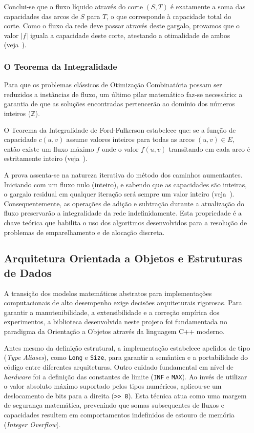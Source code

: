 \documentclass[12pt,a4paper]{article}
\begin{document}
Conclui-se que o fluxo líquido através do corte $(S, T)$ é exatamente a soma das capacidades das arcos de $S$ para $T$, o que corresponde à capacidade total do corte. Como o fluxo da rede deve passar através deste gargalo, provamos que o valor $|f|$ iguala a capacidade deste corte, atestando a otimalidade de ambos (veja~\cite{ford1956maximal}).

\subsubsection{O Teorema da Integralidade}

Para que os problemas clássicos de Otimização Combinatória possam ser reduzidos a instâncias de fluxo, um último pilar matemático faz-se necessário: a garantia de que as soluções encontradas pertencerão ao domínio dos números inteiros ($\mathbb{Z}$).

O Teorema da Integralidade de Ford-Fulkerson estabelece que: se a função de capacidade $c(u,v)$ assume valores inteiros para todas as arcos $(u,v) \in E$, então existe um fluxo máximo $f$ onde o valor $f(u,v)$ transitando em cada arco é estritamente inteiro (veja~\cite{ford1956maximal}).

A prova assenta-se na natureza iterativa do método dos caminhos aumentantes. Iniciando com um fluxo nulo (inteiro), e sabendo que as capacidades são inteiras, o gargalo residual em qualquer iteração será sempre um valor inteiro (veja~\cite{ahuja1993network}). Consequentemente, as operações de adição e subtração durante a atualização do fluxo preservarão a integralidade da rede indefinidamente. Esta propriedade é a chave teórica que habilita o uso dos algoritmos desenvolvidos para a resolução de problemas de emparelhamento e de alocação discreta.

\subsection{Arquitetura Orientada a Objetos e Estruturas de Dados}

A transição dos modelos matemáticos abstratos para implementações computacionais de alto desempenho exige decisões arquiteturais rigorosas. Para garantir a manutenibilidade, a extensibilidade e a correção empírica dos experimentos, a biblioteca desenvolvida neste projeto foi fundamentada no paradigma da Orientação a Objetos através da linguagem C++ moderno.

Antes mesmo da definição estrutural, a implementação estabelece apelidos de tipo (\textit{Type Aliases}), como \lstinline{Long} e \lstinline{Size}, para garantir a semântica e a portabilidade do código entre diferentes arquiteturas. Outro cuidado fundamental em nível de \textit{hardware} foi a definição das constantes de limite (\lstinline{INF} e \lstinline{MAX}). Ao invés de utilizar o valor absoluto máximo suportado pelos tipos numéricos, aplicou-se um deslocamento de bits para a direita (\lstinline{>> 8}). Esta técnica atua como uma margem de segurança matemática, prevenindo que somas subsequentes de fluxos e capacidades resultem em comportamentos indefinidos de estouro de memória (\textit{Integer Overflow}).
\end{document}
